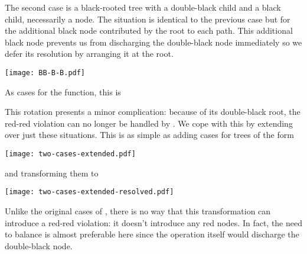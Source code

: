 \documentclass[preprint]{sigplanconf}
\begin{document}
The second case is a black-rooted tree with a double-black child and a black
child, necessarily a node. The situation is identical to the previous case but
for the additional black node contributed by the root to each path. This
additional black node prevents us from discharging the double-black node
immediately so we defer its resolution by arranging it at the root.
\begin{center}
\texttt{[image: BB-B-B.pdf]}
\end{center}
As cases for the  function, this is
\begin{schemedisplay}
[(B (BB? a-x-b) y (B c z d))
 (balance (BB (R (-B a-x-b) y c) z d))]
[(B (B a x b) y (BB? c-z-d))
 (balance (BB a x (R b y (-B c-z-d))))]
\end{schemedisplay}
This rotation presents a minor complication: because of its double-black root,
the red-red violation can no longer be handled by . We cope with
this by extending  over just these situations. This is as simple
as adding cases for trees of the form
\begin{center}
\texttt{[image: two-cases-extended.pdf]}
\end{center}
and transforming them to
\begin{center}
\texttt{[image: two-cases-extended-resolved.pdf]}
\end{center}
Unlike the original cases of , there is no way that this
transformation can introduce a red-red violation: it doesn't introduce any red
nodes. In fact, the need to balance is almost preferable here since the
operation itself would discharge the double-black node.
\end{document}
